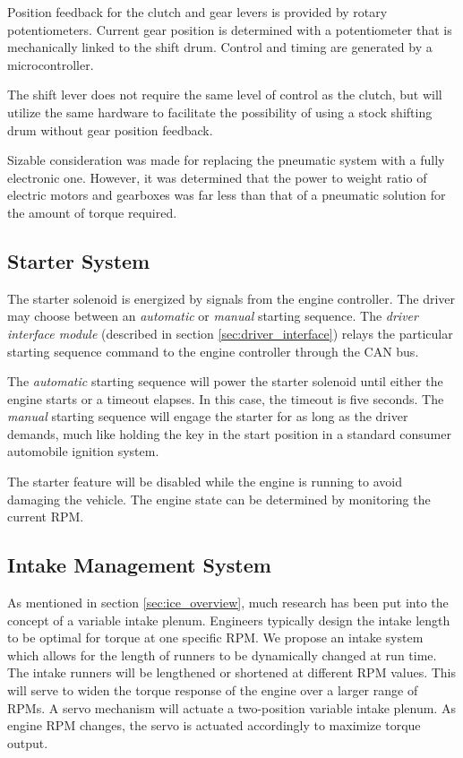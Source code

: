 Position feedback for the clutch and gear levers is provided by rotary potentiometers. Current gear position is determined with a potentiometer that is mechanically linked to the shift drum. Control and timing are generated by a microcontroller.

The shift lever does not require the same level of control as the clutch, but will utilize the same hardware to facilitate the possibility of using a stock shifting drum without gear position feedback.

Sizable consideration was made for replacing the pneumatic system with a fully electronic one. However, it was determined that the power to weight ratio of electric motors and gearboxes was far less than that of a pneumatic solution for the amount of torque required.

\subsection{Starter System}

The starter solenoid is energized by signals from the engine controller. The driver may choose between an \emph{automatic} or \emph{manual} starting sequence. The \emph{driver interface module} (described in section \ref{sec:driver_interface}) relays the particular starting sequence command to the engine controller through the CAN bus.

The \emph{automatic} starting sequence will power the starter solenoid until either the engine starts or a timeout elapses. In this case, the timeout is five seconds. The \emph{manual} starting sequence will engage the starter for as long as the driver demands, much like holding the key in the start position in a standard consumer automobile ignition system. 

The starter feature will be disabled while the engine is running to avoid damaging the vehicle. The engine state can be determined by monitoring the current RPM.

\subsection{Intake Management System}

As mentioned in section \ref{sec:ice_overview}, much research has been put into the concept of a variable intake plenum. Engineers typically design the intake length to be optimal for torque at one specific RPM. We propose an intake system which allows for the length of runners to be dynamically changed at run time. The intake runners will be lengthened or shortened at different RPM values. This will serve to widen the torque response of the engine over a larger range of RPMs. A servo mechanism will actuate a two-position variable intake plenum. As engine RPM changes, the servo is actuated accordingly to maximize torque output.

